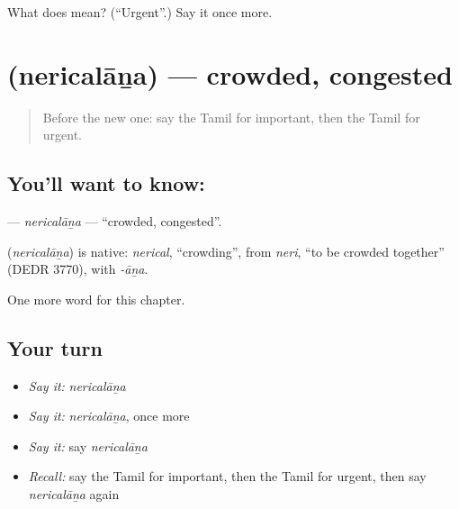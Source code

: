 \begin{tcolorbox}[breakable,colback=teal!4,colframe=teal!35!black,title={Before you move on}]
What does  mean? (\textquotedblleft{}Urgent\textquotedblright{}.) Say it once more.
\end{tcolorbox}
\section[\texorpdfstring{\ta{நெரிசலான} (nericalāṉa)}{நெரிசலான (nericalāṉa)}]{ (nericalāṉa) — crowded, congested}

\label{lesson:TA-C267-nericalana}



\begin{quote}
Before the new one: say the Tamil for important, then the Tamil for urgent.
\end{quote}

\subsection*{You'll want to know: }
\textbf{} — \emph{nericalāṉa} — \textquotedblleft{}crowded, congested\textquotedblright{}.

\begin{cousinweb}
\textbf{} (\emph{nericalāṉa}) is native: \emph{nerical}, \textquotedblleft{}crowding\textquotedblright{}, from \emph{neri}, \textquotedblleft{}to be crowded together\textquotedblright{} (DEDR 3770), with \emph{-āṉa}.
\end{cousinweb}

\begin{grammarlens}[title={What you've built}]
One more word for this chapter.
\end{grammarlens}

\subsection*{Your turn}
\begin{itemize}
\raggedright
  \item \emph{Say it:} \emph{nericalāṉa}
  \item \emph{Say it:} \emph{nericalāṉa}, once more
  \item \emph{Say it:} say \emph{nericalāṉa}
  \item \emph{Recall:} say the Tamil for important, then the Tamil for urgent, then say \emph{nericalāṉa} again
\end{itemize}

